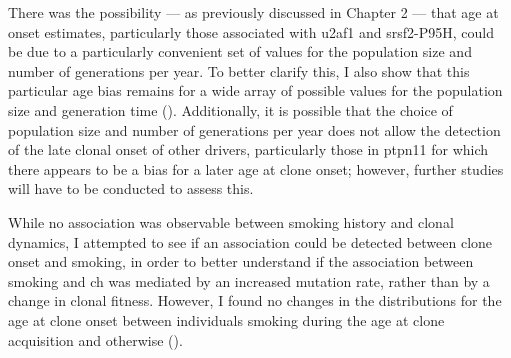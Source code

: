 \begin{figure}[!ht]
	\label{fig:age-at-onset-vs-growth}
\end{figure}

There was the possibility --- as previously discussed in Chapter 2 --- that age at onset estimates, particularly those associated with \ac{u2af1} and \ac{srsf2}-P95H, could be due to a particularly convenient set of values for the population size and number of generations per year. To better clarify this, I also show that this particular age bias remains for a wide array of possible values for the population size and generation time (). Additionally, it is possible that the choice of population size and number of generations per year does not allow the detection of the late clonal onset of other drivers, particularly those in \ac{ptpn11} for which there appears to be a bias for a later age at clone onset; however, further studies will have to be conducted to assess this.

\begin{figure}[!ht]
	\label{fig:ages-at-onset-benchmark}
\end{figure}

While no association was observable between smoking history and clonal dynamics, I attempted to see if an association could be detected between clone onset and smoking, in order to better understand if the association between smoking and \ac{ch} was mediated by an increased mutation rate, rather than by a change in clonal fitness. However, I found no changes in the distributions for the age at clone onset between individuals smoking during the age at clone acquisition and otherwise ().

\begin{figure}[!ht]
	\label{fig:smoking-age-density}
\end{figure}

